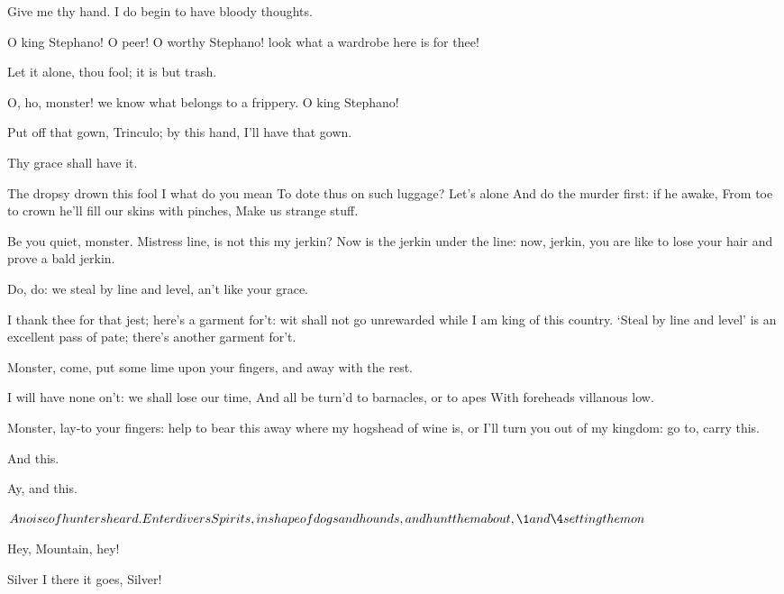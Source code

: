 \documentclass[11pt]{book}
\begin{document}
\begin{PROSE}

\8	Give me thy hand. I do begin to have bloody thoughts.

	O king Stephano! O peer! O worthy Stephano! look
	what a wardrobe here is for thee!

\5	Let it alone, thou fool; it is but trash.

	O, ho, monster! we know what belongs to a frippery.
	O king Stephano!

\8	Put off that gown, Trinculo; by this hand, I'll have
	that gown.

	Thy grace shall have it.

\end{PROSE}

\5	The dropsy drown this fool I what do you mean
	To dote thus on such luggage? Let's alone
	And do the murder first: if he awake,
	From toe to crown he'll fill our skins with pinches,
	Make us strange stuff.

\begin{PROSE}

\8	Be you quiet, monster. Mistress line,
	is not this my jerkin? Now is the jerkin under
	the line: now, jerkin, you are like to lose your
	hair and prove a bald jerkin.

	Do, do: we steal by line and level, an't like your grace.

\8	I thank thee for that jest; here's a garment for't:
	wit shall not go unrewarded while I am king of this
	country. `Steal by line and level' is an excellent
	pass of pate; there's another garment for't.

	Monster, come, put some lime upon your fingers, and
	away with the rest.

\end{PROSE}

\5	I will have none on't: we shall lose our time,
	And all be turn'd to barnacles, or to apes
	With foreheads villanous low.

\begin{PROSE}

\8	Monster, lay-to your fingers: help to bear this
	away where my hogshead of wine is, or I'll turn you
	out of my kingdom: go to, carry this.

	And this.

\8	Ay, and this.

	\(A noise of hunters heard. Enter divers Spirits,
	in shape of dogs and hounds, and hunt them about,
	\1 and \4 setting them on\)

\1	Hey, Mountain, hey!

\4	Silver I there it goes, Silver!

\end{PROSE}
\end{document}
